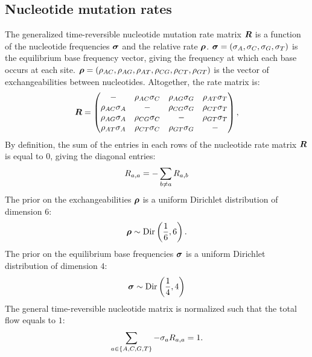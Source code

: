\subsection{Nucleotide mutation rates}
The generalized time-reversible nucleotide mutation rate matrix $\bm{R}$ is a function of the nucleotide frequencies $\bm{\sigma}$ and the relative rate $\bm{\rho}$.
$\bm{\sigma} = (\sigma_A , \sigma_C , \sigma_G , \sigma_T)$ is the equilibrium base frequency vector, giving the frequency at which each base occurs at each site.
$\bm{\rho} = \left( \rho_{AC}, \rho_{AG}, \rho_{AT}, \rho_{CG}, \rho_{CT}, \rho_{GT}\right)$ is the vector of exchangeabilities between nucleotides.
Altogether, the rate matrix is:
\begin{equation}
\label{eq:gtr-mutrates}
\Mutmatrix = \begin{pmatrix}
- & {\exchan_{AC} \mutequi_C} & {\exchan_{AG}\mutequi_G} & {\exchan_{AT}\mutequi_T} \\ 
{\exchan_{AC}\mutequi_A} & - & {\exchan_{CG}\mutequi_G} & {\exchan_{CT}\mutequi_T} \\ 
{\exchan_{AG}\mutequi_A} & {\exchan_{CG}\mutequi_C} & - & {\exchan_{GT}\mutequi_T} \\ 
{\exchan_{AT}\mutequi_A} & {\exchan_{CT}\mutequi_C} & {\exchan_{GT}\mutequi_G} & - 
\end{pmatrix},
\end{equation}
By definition, the sum of the entries in each rows of the nucleotide rate matrix $\bm{R}$ is equal to $0$, giving the diagonal entries:
\begin{equation}
R_{a,a} = - \sum_{ b \neq a} R_{a,b}
\end{equation}
The \gls{prior} on the exchangeabilities $\bm{\rho}$ is a uniform Dirichlet distribution of dimension $6$:
\begin{equation}
\label{eq:DistribExchan}
\Exchan \sim \mathrm{Dir}\left( \dfrac{1}{6} , 6\right).
\end{equation}
The \gls{prior} on the equilibrium base frequencies $\bm{\sigma}$ is a uniform Dirichlet distribution of dimension $4$:
\begin{equation}
\label{eq:DistribMutequi}
\Mutequi \sim \mathrm{Dir}\left( \dfrac{1}{4} , 4\right)
\end{equation}
The general time-reversible nucleotide matrix is normalized such that the total flow equals to $1$:
\begin{equation}
\sum_{a \in \{A, C, G, T\}} - \sigma_a R_{a,a} = 1.
\end{equation}

